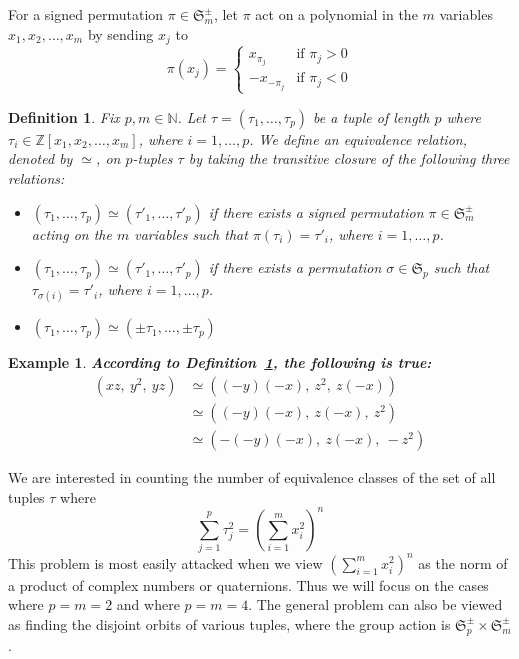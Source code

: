 \documentclass[12pt]{article}
\newtheorem{definition}[theorem]{Definition}
\newtheorem{example}[theorem]{Example}
\numberwithin{equation}{section}
\begin{document}
\begin{landscape}
{{For a signed permutation \( \pi \in \mathfrak{S}_m^\pm \), let \( \pi \) act on a polynomial in the 
\(m\) variables \( x_1,x_2, \ldots, x_m \) by sending \( x_j \) to 
\[
\pi(x_j) =
\begin{cases}
x_{\pi_j} & \text{if } \pi_j > 0 \\
-x_{-\pi_j} & \text{if } \pi_j < 0
\end{cases}
\]

\begin{definition}
\label{def:general}
Fix \( p, m \in \mathbb{N} \). 
Let \( \tau = ( \tau_1, \ldots, \tau_p) \)
be a tuple of length \( p \) where 
\( \tau_i \in \mathbb{Z}[x_1,x_2, \ldots, x_m] \), where \( i = 1, \ldots, p \).
We define an equivalence relation, denoted by \( \simeq \), on \(p\)-tuples
\( \tau \) 
by taking the transitive closure of the following three relations:
\begin{itemize}
\item
\( ( \tau_1, \ldots, \tau_p) \simeq ( \tau'_1, \ldots, \tau'_p) \)
if there exists a signed permutation \( \pi \in \mathfrak{S}_m^\pm \)
acting on the \( m \) variables such that \( \pi( \tau_i ) = \tau'_i \),
 where \( i = 1, \ldots, p \).
\item
\( ( \tau_1, \ldots, \tau_p) \simeq ( \tau'_1, \ldots, \tau'_p) \)
if there exists a permutation \( \sigma \in \mathfrak{S}_p \)
such that \( \tau_{\sigma(i)} = \tau'_i \), where \( i = 1, \ldots, p \).
\item
\( ( \tau_1, \ldots, \tau_p) \simeq ( \pm \tau_1, \ldots, \pm \tau_p) \)
\end{itemize}
\end{definition}


\begin{example}
\bf
According to Definition~\ref{def:general}, the following is true:
\begin{align*}
( xz,\: y^2,\: yz )  
&\simeq ( (-y)(-x),\: z^2,\: z(-x) ) \\
&\simeq ( (-y)(-x),\: z(-x),\: z^2 ) \\
&\simeq ( -(-y)(-x),\: z(-x),\: -z^2 ) 
\end{align*}

\end{example}



We are interested in counting the number of
equivalence classes of the set of all tuples \( \tau \) where 
\[
\sum_{j = 1}^{p}  \tau_j ^ 2  
= 
\left( \sum_{i = 1}^{m}  x_i ^ 2  \right) ^ n 
\] 
This problem is most easily attacked when we
view \( \left( \sum_{i = 1}^{m}  x_i ^ 2  \right) ^ n \)
as the norm of a product of complex numbers or quaternions.
Thus we will focus on the cases where \( p = m = 2 \) and where \( p = m = 4 \).
The general problem can also be viewed as finding the disjoint orbits of 
various tuples, where the group action is \( \mathfrak{S}_p^\pm \times \mathfrak{S}_m^\pm \).



}}
\end{landscape}
\end{document}
